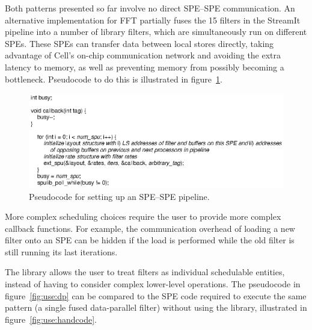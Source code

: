 Both patterns presented so far involve no direct SPE--SPE communication. An alternative implementation for FFT partially fuses the 15 filters in the StreamIt pipeline into a number of library filters, which are simultaneously run on different SPEs. These SPEs can transfer data between local stores directly, taking advantage of Cell's on-chip communication network and avoiding the extra latency to memory, as well as preventing memory from possibly becoming a bottleneck. Pseudocode to do this is illustrated in figure~\ref{fig:use:spepipecode}.


\begin{figure}[!htb]
\begin{center}
\includegraphics{figs/spepipecode}
\end{center}
\caption{Pseudocode for setting up an SPE--SPE pipeline.}
\label{fig:use:spepipecode}
\end{figure}

More complex scheduling choices require the user to provide more complex callback functions. For example, the communication overhead of loading a new filter onto an SPE can be hidden if the load is performed while the old filter is still running its last iterations.

The library allows the user to treat filters as individual schedulable entities, instead of having to consider complex lower-level operations. The pseudocode in figure~\ref{fig:use:dp} can be compared to the SPE code required to execute the same pattern (a single fused data-parallel filter) without using the library, illustrated in figure~\ref{fig:use:handcode}.

